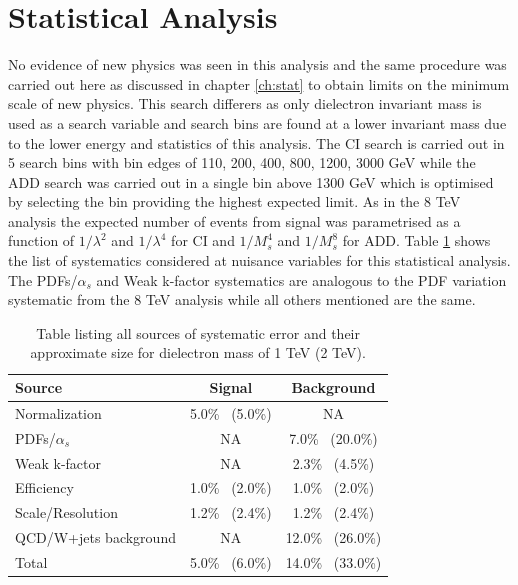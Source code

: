 \section{Statistical Analysis}
	\label{sec:7tev_stat}

	No evidence of new physics was seen in this analysis and the same procedure was carried out here as discussed in chapter \ref{ch:stat} to obtain limits on the minimum scale of new physics. This search differers as only dielectron invariant mass is used as a search variable and search bins are found at a lower invariant mass due to the lower energy and statistics of this analysis. The CI search is carried out in 5 search bins with bin edges of {110, 200, 400, 800, 1200, 3000} GeV while the ADD search was carried out in a single bin above 1300 GeV which is optimised by selecting the bin providing the highest expected limit. As in the 8 TeV analysis the expected number of events from signal was parametrised as a function of $1/\lambda^{2}$ and $1/\lambda^{4}$ for CI and $1/M_{s}^{4}$ and $1/M_{s}^{8}$ for ADD. Table \ref{tab:sys7} shows the list of systematics considered at nuisance variables for this statistical analysis. The PDFs/$\alpha_{s}$ and Weak k-factor systematics are analogous to the PDF variation systematic from the 8 TeV analysis while all others mentioned are the same. 


	\begin {table}[h]
        \begin{center}
        \begin{tabular}{ | l | c c | } 
            \hline
            Source 					& Signal            & Background         		\\
            \hline
            Normalization       	& 5.0\% ~(5.0\%)      	& NA        			\\
			PDFs/$\alpha_{s}$		& NA 			      	& 7.0\% ~(20.0\%)      	\\
			Weak k-factor       	& NA 			      	& 2.3\% ~(4.5\%)       	\\
			Efficiency  	     	& 1.0\% ~(2.0\%)      	& 1.0\% ~(2.0\%)       	\\
			Scale/Resolution       	& 1.2\% ~(2.4\%)      	& 1.2\% ~(2.4\%)       	\\
			QCD/W+jets background  	& NA 			      	& 12.0\% ~(26.0\%)      \\
            \hline  
            Total               	& 5.0\% ~(6.0\%)      	& 14.0\% ~(33.0\%)      \\
            \hline
        \end{tabular}
        \caption{Table listing all sources of systematic error and their approximate size for dielectron mass of 1 TeV (2 TeV).}
        \label{tab:sys7}
        \end{center}
    \end {table}



